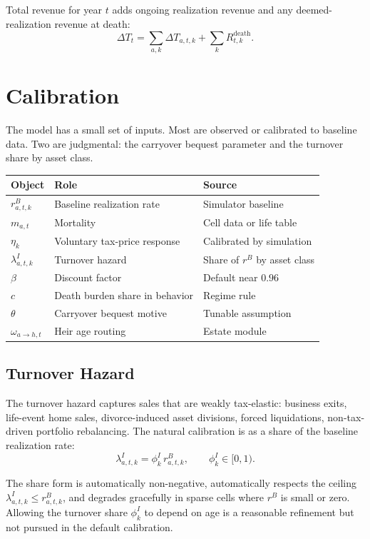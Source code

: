 \documentclass[11pt]{article}
\newcommand{\dT}{\Delta T}
\begin{document}
Total revenue for year $t$ adds ongoing realization revenue and any
deemed-realization revenue at death:
\[
\boxed{
\dT_t
=
\sum_{a,k}\dT_{a,t,k}
+
\sum_k R^{\mathrm{death}}_{t,k}.
}
\]

\section{Calibration}

The model has a small set of inputs. Most are observed or calibrated to
baseline data. Two are judgmental: the carryover bequest parameter and the
turnover share by asset class.

\begin{center}
\begin{tabular}{lll}
\toprule
Object & Role & Source \\
\midrule
$r^B_{a,t,k}$ & Baseline realization rate & Simulator baseline \\
$m_{a,t}$ & Mortality & Cell data or life table \\
$\eta_k$ & Voluntary tax-price response & Calibrated by simulation \\
$\lambda^I_{a,t,k}$ & Turnover hazard & Share of $r^B$ by asset class \\
$\beta$ & Discount factor & Default near $0.96$ \\
$c$ & Death burden share in behavior & Regime rule \\
$\theta$ & Carryover bequest motive & Tunable assumption \\
$\omega_{a\to h,t}$ & Heir age routing & Estate module \\
\bottomrule
\end{tabular}
\end{center}

\subsection{Turnover Hazard}

The turnover hazard captures sales that are weakly tax-elastic: business
exits, life-event home sales, divorce-induced asset divisions, forced
liquidations, non-tax-driven portfolio rebalancing. The natural calibration
is as a share of the baseline realization rate:
\[
\lambda^I_{a,t,k} = \phi^I_k\, r^B_{a,t,k}, \qquad \phi^I_k\in[0,1).
\]

The share form is automatically non-negative, automatically respects the
ceiling $\lambda^I_{a,t,k}\le r^B_{a,t,k}$, and degrades gracefully in
sparse cells where $r^B$ is small or zero. Allowing the turnover share
$\phi^I_k$ to depend on age is a reasonable refinement but not pursued
in the default calibration.
\end{document}
